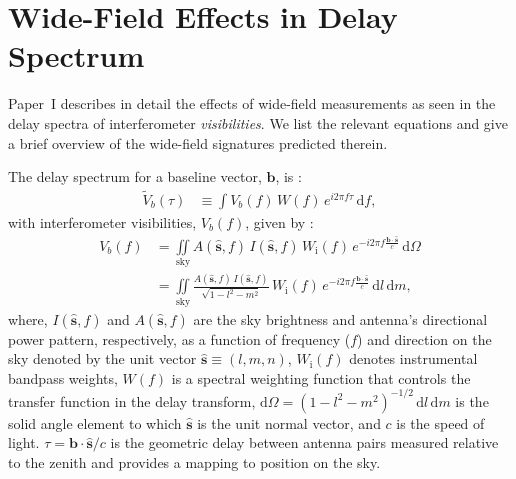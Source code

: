 \documentclass[preprint2,apjl,numberedappendix,twocolappendix,appendixfloats]{emulateapj}
\newcommand{\dif}{\mathrm{d}}
\begin{document}
\section{Wide-Field Effects in Delay Spectrum}\label{sec:wide-field}

Paper~I describes in detail the effects of wide-field measurements as seen in the delay spectra of interferometer {\it visibilities}. We list the relevant equations and give a brief overview of the wide-field signatures predicted therein. 

The delay spectrum for a baseline vector, $\boldsymbol{b}$, is \citep[][Paper~I]{par12a,par12b,thy13}: 
\begin{align}
  \widetilde{V}_b(\tau) &\equiv \int V_b(f)\,W(f)\,e^{i2\pi f\tau}\,\dif f,
\end{align}
with interferometer visibilities, $V_b(f)$, given by \citep{van34,zer38,tho01}:
\begin{align} 
  V_b(f) &= \iint\limits_\textrm{sky} A(\hat{\boldsymbol{s}},f)\,I(\hat{\boldsymbol{s}},f)\,W_\textrm{i}(f)\,e^{-i2\pi f\frac{\boldsymbol{b}\cdot\hat{\boldsymbol{s}}}{c}}\,\dif\Omega \\
         &= \iint\limits_\textrm{sky} \frac{A(\hat{\boldsymbol{s}},f)\,I(\hat{\boldsymbol{s}},f)}{\sqrt{1-l^2-m^2}}\,W_\textrm{i}(f)\,e^{-i2\pi f\frac{\boldsymbol{b}\cdot\hat{\boldsymbol{s}}}{c}}\,\dif l\,\dif m, 
\end{align}
where, $I(\hat{\boldsymbol{s}},f)$ and $A(\hat{\boldsymbol{s}},f)$ are the sky brightness and antenna's directional power pattern, respectively, as a function of frequency ($f$) and direction on the sky denoted by the unit vector $\hat{\boldsymbol{s}}\equiv (l,m,n)$, $W_\textrm{i}(f)$ denotes instrumental bandpass weights, $W(f)$ is a spectral weighting function that controls the transfer function in the delay transform, $\dif\Omega=(1-l^2-m^2)^{-1/2}\,\dif l\,\dif m$ is the solid angle element to which $\hat{\boldsymbol{s}}$ is the unit normal vector, and $c$ is the speed of light. $\tau=\boldsymbol{b}\cdot\hat{\boldsymbol{s}}/c$ is the geometric delay between antenna pairs measured relative to the zenith and provides a mapping to position on the sky.
\end{document}
